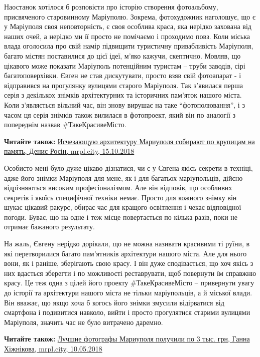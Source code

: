 Наостанок хотілося б розповісти про історію створення фотоальбому, присвяченого
старовинному Маріуполю. Зокрема, фотохудожник наголошує, що є у Маріуполя своя
неповторність, є своя особлива краса, яка нерідко захована від наших очей, а
нерідко ми її просто не помічаємо і проходимо повз. Коли міська влада оголосила
про свій намір підвищити туристичну привабливість Маріуполя, багато містян
поставилися до цієї ідеї, м'яко кажучи, скептично. Мовляв, що цікавого може
показати Маріуполь потенційним туристам – труби заводів, сірі багатоповерхівки.
Євген не став дискутувати, просто взяв свій фотоапарат - і відправився на
прогулянку вулицями старого Маріуполя. Так з'явилася перша серія з декількох
знімків архітектурних та історичних пам'яток нашого міста. Коли з'являється
вільний час, він знову вирушає на таке \enquote{фотополювання}, і з часом ця серія
знімків також вилилася в фотопроект, який він по аналогії з попереднім назвав
\#ТакеКрасивеМісто.

\textbf{Читайте також:} \href{https://mrpl.city/news/view/ischezayushhuyu-arhitekturu-mariupolya-sobirayut-po-krupitsam-na-pamyatfoto-plusvideo}{%
Исчезающую архитектуру Мариуполя собирают по крупицам на память, Денис Росін, mrpl.city, 15.10.2018}

Особисто мені було дуже цікаво дізнатися, чи є у Євгена якісь секрети в
техніці, адже його знімки Маріуполя для мене, як і для багатьох маріупольців,
дійсно відрізняються високим професіоналізмом. Але він відповів, що особливих
секретів і якоїсь специфічної техніки немає. Просто для кожного знімку він
шукає цікавий ракурс, обирає час для кращого освітлення і чекає відповідної
погоди. Буває, що на одне і теж місце повертається по кілька разів, поки не
отримає бажаного результату.

На жаль, Євгену нерідко дорікали, що не можна називати красивими ті руїни, в
які перетворилися багато пам’ятників архітектури нашого міста. Але для нього
вони, як і раніше, зберігають свою красу. І він дуже сподівається, що хоч якісь
з них вдасться зберегти і по можливості реставрувати, щоб повернути їм справжню
красу. Це теж одна з цілей його проекту \#ТакеКрасивеМісто – привернути увагу до
історії та архітектури нашого міста не тільки маріупольців, а й міської влади.
Він вважає, що якщо хоча б когось його знімки змусили відірватися від смартфона
і подивитися навколо, вийти і просто прогулятися старими вулицями Маріуполя,
значить час не було витрачено даремно.

\textbf{Читайте також:} \href{https://mrpl.city/news/view/luchshie-fotografy-mariupolya-poluchili-po-3-tys-grn}{%
Лучшие фотографы Мариуполя получили по 3 тыс. грн, Ганна Хіжнікова, mrpl.city, 10.05.2018}

